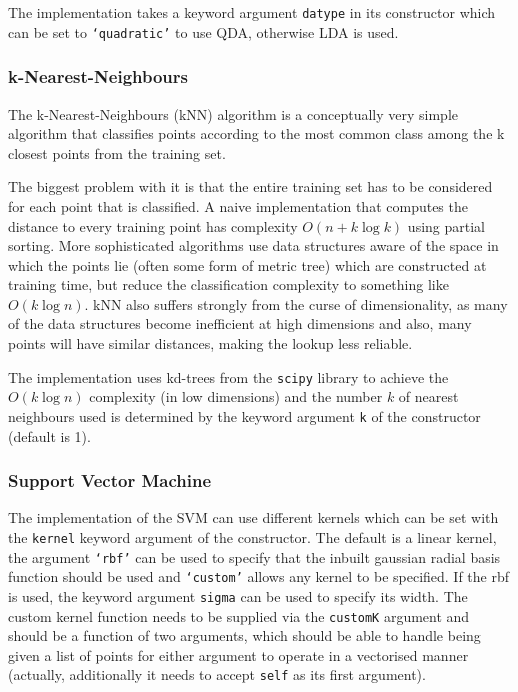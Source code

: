 \documentclass[a4paper]{article}
\begin{document}
The implementation takes a keyword argument \texttt{datype} in its constructor which can be set to \texttt{`quadratic'} to use QDA, otherwise LDA is used.

\subsubsection{k-Nearest-Neighbours}
The k-Nearest-Neighbours (kNN) algorithm is a conceptually very simple algorithm that classifies points according to the most common class among the k closest points from the training set.

The biggest problem with it is that the entire training set has to be considered for each point that is classified. A naive implementation that computes the distance to every training point has complexity $O(n + k \log k)$ using partial sorting. More sophisticated algorithms use data structures aware of the space in which the points lie (often some form of metric tree) which are constructed at training time, but reduce the classification complexity to something like $O(k \log n)$. kNN also suffers strongly from the curse of dimensionality, as many of the data structures become inefficient at high dimensions and also, many points will have similar distances, making the lookup less reliable.

The implementation uses kd-trees from the \texttt{scipy} library to achieve the $O(k \log n)$ complexity (in low dimensions) and the number $k$ of nearest neighbours used is determined by the keyword argument \texttt{k} of the constructor (default is 1).

\subsubsection{Support Vector Machine} %
The implementation of the SVM can use different kernels which can be set with the \texttt{kernel} keyword argument of the constructor. The default is a linear kernel, the argument \texttt{`rbf'} can be used to specify that the inbuilt gaussian radial basis function should be used and \texttt{`custom'} allows any kernel to be specified. If the rbf is used, the keyword argument \texttt{sigma} can be used to specify its width. The custom kernel function needs to be supplied via the \texttt{customK} argument and should be a function of two arguments, which should be able to handle being given a list of points for either argument to operate in a vectorised manner (actually, additionally it needs to accept \texttt{self} as its first argument).
\end{document}
